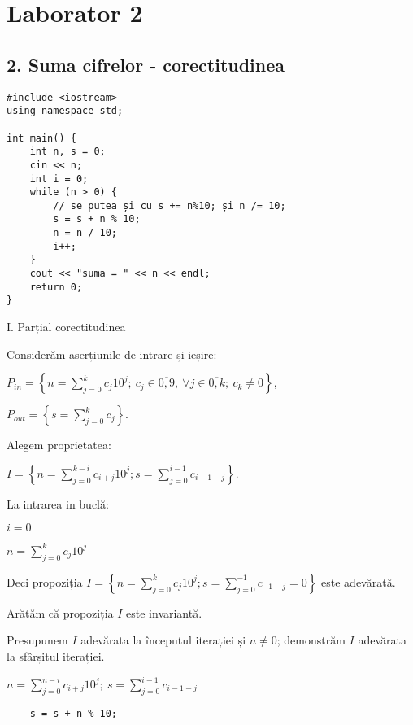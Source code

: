 \documentclass[11pt]{article}
\begin{document}
\section*{Laborator 2}
\label{sec:org85960ce}
\subsection*{2. Suma cifrelor - corectitudinea}
\label{sec:orgbf804b1}

\begin{verbatim}
#include <iostream>
using namespace std;

int main() {
    int n, s = 0;
    cin << n;
    int i = 0;
    while (n > 0) {
        // se putea și cu s += n%10; și n /= 10;
        s = s + n % 10;
        n = n / 10;
        i++;
    }
    cout << "suma = " << n << endl;
    return 0;
}
\end{verbatim}

I. Parțial corectitudinea
\newline

Considerăm aserțiunile de intrare și ieșire:

$P_{in} = \left\{ n = \sum\limits_{j=0}^{k} c_{j}10^{j};\ 
                c_{j} \in \overline{0,9} ,\ \forall j \in \overline{0,k};\ 
                c_{k} \neq 0 \right\}$,

$P_{out} = \left\{ s = \sum\limits_{j=0}^{k} c_{j} \right\}$.

\vspace{14pt}
Alegem proprietatea:

$I = \left\{
              n = \sum\limits_{j=0}^{k-i}c_{i+j}10^{j};
              s = \sum\limits_{j=0}^{i-1}c_{i-1-j}
 \right\}$.

\vspace{14pt}
La intrarea in buclă:

$i = 0$

$n = \sum\limits_{j=0}^{k}c_{j}10^{j}$

Deci propoziția
$I = \left\{
              n = \sum\limits_{j=0}^{k}c_{j}10^{j};
              s = \sum\limits_{j=0}^{-1}c_{-1-j} = 0
      \right\}$ 
 este adevărată.

Arătăm că propoziția $I$ este invariantă.

Presupunem $I$ adevărata la începutul iterației și $n \ne 0$; demonstrăm $I$ adevărata la sfârșitul iterației.

$n = \sum\limits_{j=0}^{n-i}c_{i+j}10^{j};\ 
s = \sum\limits_{j=0}^{i-1}c_{i-1-j}
$
\begin{verbatim}
    s = s + n % 10;
\end{verbatim}
\end{document}
